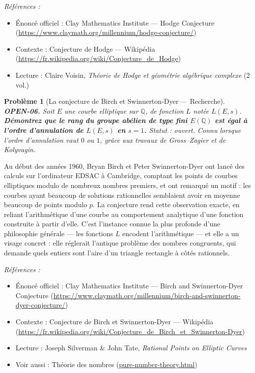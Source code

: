 \documentclass[11pt]{article}
\newtheorem{problem}{Problème}
\newenvironment{refs}{\par\small\noindent\emph{Références :}\begin{itemize}\setlength\itemsep{0pt}}{\end{itemize}\normalsize}
\begin{document}
\begin{refs}
\item Énoncé officiel : Clay Mathematics Institute --- Hodge Conjecture (\url{https://www.claymath.org/millennium/hodge-conjecture/})
\item Contexte : Conjecture de Hodge --- Wikipédia (\url{https://fr.wikipedia.org/wiki/Conjecture_de_Hodge})
\item Lecture : Claire Voisin, \textit{Théorie de Hodge et géométrie algébrique complexe} (2 vol.)
\end{refs}

\bigskip

\begin{problem}[{La conjecture de Birch et Swinnerton-Dyer --- Recherche}]
\textbf{OPEN-06.} Soit $ E $ une courbe elliptique sur
$ \mathbb{Q} $, de fonction $ L $ notée $ L(E,s) $. \textbf{Démontrez que le rang du
groupe abélien de type fini $ E(\mathbb{Q}) $ est égal à l'ordre d'annulation de
$ L(E,s) $ en $ s = 1 $.} Statut : ouvert. Connu lorsque l'ordre d'annulation vaut
$ 0 $ ou $ 1 $, grâce aux travaux de Gross--Zagier et de Kolyvagin.
\end{problem}

\noindent Au début des années 1960, Bryan Birch et Peter Swinnerton-Dyer ont
lancé des calculs sur l'ordinateur EDSAC à Cambridge, comptant les points de courbes
elliptiques modulo de nombreux nombres premiers, et ont remarqué un motif : les courbes
ayant beaucoup de solutions rationnelles semblaient avoir en moyenne beaucoup de points
modulo $ p $. La conjecture rend cette observation exacte, en reliant l'arithmétique
d'une courbe au comportement analytique d'une fonction construite à partir d'elle. C'est
l'instance connue la plus profonde d'une philosophie générale --- les fonctions $ L $
encodent l'arithmétique --- et elle a un visage concret : elle réglerait l'antique problème
des nombres congruents, qui demande quels entiers sont l'aire d'un triangle rectangle à
côtés rationnels.

\begin{refs}
\item Énoncé officiel : Clay Mathematics Institute --- Birch and Swinnerton-Dyer Conjecture (\url{https://www.claymath.org/millennium/birch-and-swinnerton-dyer-conjecture/})
\item Contexte : Conjecture de Birch et Swinnerton-Dyer --- Wikipédia (\url{https://fr.wikipedia.org/wiki/Conjecture_de_Birch_et_Swinnerton-Dyer})
\item Lecture : Joseph Silverman \& John Tate, \textit{Rational Points on Elliptic Curves}
\item Voir aussi : Théorie des nombres (\url{pure-number-theory.html})
\end{refs}
\end{document}
